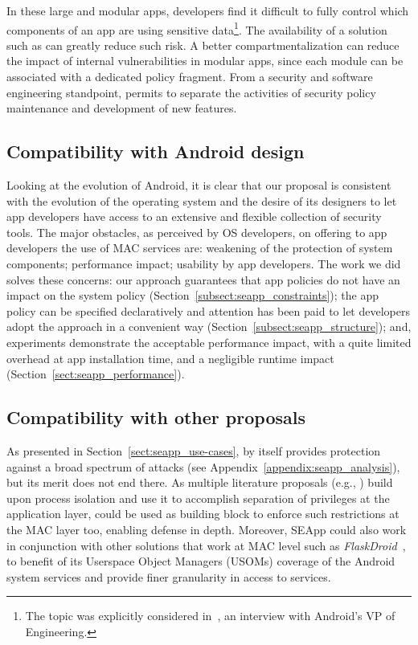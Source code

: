 In these large and modular apps, developers find it difficult to fully
control which components of an app are using sensitive
data\footnote{The topic was explicitly considered
  in~\cite{seapp_burke_interview}, an interview with Android's VP of
  Engineering.}.  The availability of a solution such as \seapp can
greatly reduce such risk.  A better compartmentalization can reduce
the impact of internal vulnerabilities in modular apps, since each
module can be associated with a dedicated policy fragment.  From a
security and software engineering standpoint, \seapp permits to separate
the activities of security policy maintenance and development of new
features.

\subsection{Compatibility with Android design}

Looking at the evolution of Android, it is clear that our proposal is
consistent with the evolution of the operating system and the desire
of its designers to let app developers have access to an extensive and
flexible collection of security tools.  The major obstacles, as
perceived by OS developers, on offering to app developers the use of
MAC services are: weakening of the protection of system components;
performance impact; usability by app developers.  The work we did
solves these concerns: our approach guarantees that app policies do
not have an impact on the system policy
(Section~\ref{subsect:seapp_constraints}); the app policy can be
specified declaratively and attention has been paid to let developers
adopt the approach in a convenient way
(Section~\ref{subsect:seapp_structure}); and, experiments demonstrate
the acceptable performance impact, with a quite limited overhead at
app installation time, and a negligible runtime impact
(Section~\ref{sect:seapp_performance}).

\subsection{Compatibility with other proposals}
As presented in Section~\ref{sect:seapp_use-cases}, \seapp by itself
provides protection against a broad spectrum of attacks (see
Appendix~\ref{appendix:seapp_analysis}), but its merit does not end
there.  As multiple literature proposals (e.g.,
\cite{seapp_10.1145/3133956.3134064, seapp_boxify, seapp_aframe})
build upon process isolation and use it to accomplish separation of
privileges at the application layer, \seapp could be used as building
block to enforce such restrictions at the MAC layer too, enabling
defense in depth. Moreover, SEApp could also work in conjunction with
other solutions that work at MAC level such as {\em
  FlaskDroid}~\cite{seapp_flaskdroid}, to benefit of its Userspace
Object Managers (USOMs) coverage of the Android system services and
provide finer granularity in access to services.



